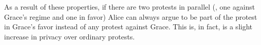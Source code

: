 As a result of these properties, if there are two protests in parallel (\eg, one against Grace's regime and one in favor) Alice can always argue to be part of the protest in Grace's favor instead of any protest against Grace.
This is, in fact, is a slight increase in privacy over ordinary protests.

